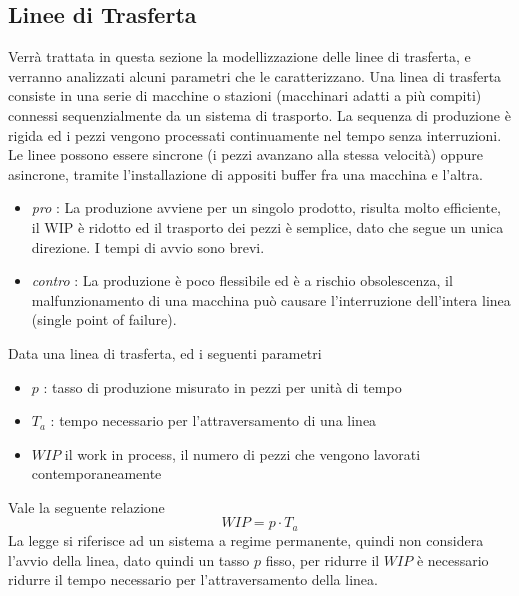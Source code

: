 \documentclass[10pt, letterpaper]{report}
\begin{document}
\subsection{Linee di Trasferta}
Verrà trattata in questa sezione la modellizzazione delle linee di trasferta, e verranno analizzati 
alcuni parametri che le caratterizzano. Una linea di trasferta consiste in una serie di macchine o stazioni 
(macchinari adatti a più compiti) connessi sequenzialmente da un sistema di trasporto. La sequenza di produzione 
è rigida ed i pezzi vengono processati continuamente nel tempo senza interruzioni. Le linee possono essere 
sincrone (i pezzi avanzano alla stessa velocità) oppure asincrone, tramite l'installazione di appositi 
buffer fra una macchina e l'altra.\begin{itemize}
    \item \textit{pro} : La produzione avviene per un singolo prodotto, risulta molto efficiente, il WIP è 
    ridotto ed il trasporto dei pezzi è semplice, dato che segue un unica direzione. I tempi di avvio sono brevi. 
    \item \textit{contro} : La produzione è poco flessibile ed è a rischio obsolescenza, il malfunzionamento 
    di una macchina può causare l'interruzione dell'intera linea (single point of failure).
\end{itemize}
 Data una linea di trasferta, ed i seguenti parametri \begin{itemize}
    \item $p$ : tasso di produzione misurato in pezzi per unità di tempo 
    \item $T_a$ : tempo necessario per l'attraversamento di una linea 
    \item $WIP$ il work in process,  il numero di pezzi che vengono 
    lavorati contemporaneamente
\end{itemize}
Vale la seguente relazione $$ WIP = p\cdot T_a$$
La legge si riferisce ad un sistema a regime permanente, quindi non considera l'avvio della linea, dato quindi 
un tasso $p$ fisso, per ridurre il $WIP$ è necessario ridurre il  tempo necessario 
per l'attraversamento della linea. 
\end{document}
